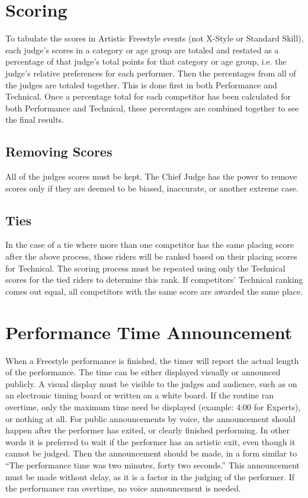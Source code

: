 \section{Scoring}
To tabulate the scores in Artistic Freestyle events (not X-Style or Standard Skill), each judge's scores in a category or age group are totaled and restated as a percentage of that judge's total points for that category or age group, i.e. the judge's relative preferences for each performer.
Then the percentages from all of the judges are totaled together.
This is done first in both Performance and Technical.
Once a percentage total for each competitor has been calculated for both Performance and Technical, these percentages are combined together to see the final results.

\subsection{Removing Scores}
All of the judges scores must be kept.
The Chief Judge has the power to remove scores only if they are deemed to be biased, inaccurate, or another extreme case.

\subsection{Ties}
In the case of a tie where more than one competitor has the same placing score after the above process, those riders will be ranked based on their placing scores for Technical.
The scoring process must be repeated using only the Technical scores for the tied riders to determine this rank.
If competitors' Technical ranking comes out equal, all competitors with the same score are awarded the same place.

\section{Performance Time Announcement}
When a Freestyle performance is finished, the timer will report the actual length of the performance.
The time can be either displayed visually or announced publicly.
A visual display must be visible to the judges and audience, such as on an electronic timing board or written on a white board.
If the routine ran overtime, only the maximum time need be displayed (example: 4:00 for Experts), or nothing at all.
For public announcements by voice, the announcement should happen after the performer has exited, or clearly finished performing.
In other words it is preferred to wait if the performer has an artistic exit, even though it cannot be judged.
Then the announcement should be made, in a form similar to ``The performance time was two minutes, forty two seconds.'' This announcement must be made without delay, as it is a factor in the judging of the performer.
If the performance ran overtime, no voice announcement is needed.

